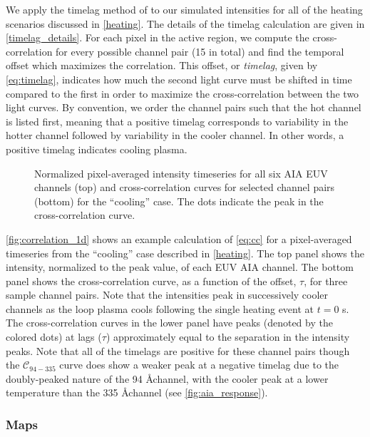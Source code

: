 We apply the timelag method of \citet{viall_evidence_2012} to our simulated intensities for all of the heating scenarios discussed in \autoref{heating}. The details of the timelag calculation are given in \autoref{timelag_details}. For each pixel in the active region, we compute the cross-correlation for every possible channel pair (15 in total) and find the temporal offset which maximizes the correlation. This offset, or \textit{timelag}, given by \autoref{eq:timelag}, indicates how much the second light curve must be shifted in time compared to the first in order to maximize the cross-correlation between the two light curves. By convention, we order the channel pairs such that the hot channel is listed first, meaning that a positive timelag corresponds to variability in the hotter channel followed by variability in the cooler channel. In other words, a positive timelag indicates cooling plasma.

\begin{figure}
    \caption{Normalized pixel-averaged intensity timeseries for all six AIA EUV channels (top) and cross-correlation curves for selected channel pairs (bottom) for the ``cooling'' case. The dots indicate the peak in the cross-correlation curve.}
    \label{fig:correlation_1d}
\end{figure}

\autoref{fig:correlation_1d} shows an example calculation of \autoref{eq:cc} for a pixel-averaged timeseries from the ``cooling'' case described in \autoref{heating}. The top panel shows the intensity, normalized to the peak value, of each EUV AIA channel. The bottom panel shows the cross-correlation curve, as a function of the offset, $\tau$, for three sample channel pairs. Note that the intensities peak in successively cooler channels as the loop plasma cools following the single heating event at $t=0$ s. The cross-correlation curves in the lower panel have peaks (denoted by the colored dots) at lags ($\tau$) approximately equal to the separation in the intensity peaks. Note that all of the timelags are positive for these channel pairs though the $\mathcal{C}_{94-335}$ curve does show a weaker peak at a negative timelag due to the doubly-peaked nature of the 94 \AA channel, with the cooler peak at a lower temperature than the 335 \AA channel (see \autoref{fig:aia_response}).

\subsubsection{Maps}\label{timelag_maps}

